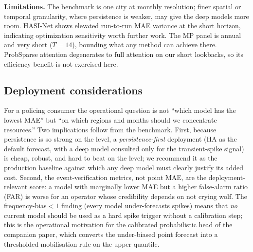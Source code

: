 \documentclass[11pt,conference]{IEEEtran}
\begin{document}
\textbf{Limitations.} The benchmark is one city at monthly resolution; finer
spatial or temporal granularity, where persistence is weaker, may give the
deep models more room. HASI-Net shows elevated run-to-run MAE variance at the
short horizon, indicating optimization sensitivity worth further work. The
MP panel is annual and very short ($T{=}14$), bounding what any method can
achieve there. ProbSparse attention degenerates to full attention on our short
lookbacks, so its efficiency benefit is not exercised here.

\subsection{Deployment considerations}\label{sec:deploy}
For a policing consumer the operational question is not ``which model has the
lowest MAE'' but ``on which regions and months should we concentrate
resources.'' Two implications follow from the benchmark. First, because
persistence is so strong on the level, a \emph{persistence-first} deployment
(HA as the default forecast, with a deep model consulted only for the
transient-spike signal) is cheap, robust, and hard to beat on the level; we
recommend it as the production baseline against which any deep model must
clearly justify its added cost. Second, the event-verification metrics, not
point MAE, are the deployment-relevant score: a model with marginally lower
MAE but a higher false-alarm ratio (FAR) is worse for an operator whose
credibility depends on not crying wolf. The frequency-bias${<}1$ finding
(every model under-forecasts spikes) means that \emph{no} current model should
be used as a hard spike trigger without a calibration step; this is the
operational motivation for the calibrated probabilistic head of the companion
paper, which converts the under-biased point forecast into a thresholded
mobilisation rule on the upper quantile.
\end{document}
